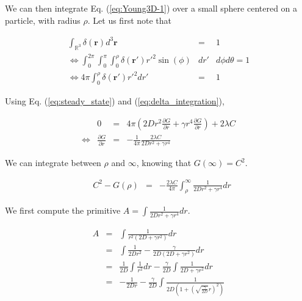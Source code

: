 \documentclass[english]{article}
\begin{document}
We can then integrate Eq. (\ref{eq:Young3D-1}) over a small sphere
centered on a particle, with radius $\rho$. Let us first note that

\begin{onehalfspace}
\noindent 
\begin{eqnarray}
\int_{\mathbb{R}^{3}}\delta(\boldsymbol{r})d^{3}\boldsymbol{r} & = & 1\nonumber \\
\Leftrightarrow\int_{0}^{2\pi}\int_{0}^{\pi}\int_{0}^{\rho}\delta(\boldsymbol{r}')r'^{2}\sin(\phi) & dr' & d\phi d\theta=1\nonumber \\
\Leftrightarrow4\pi\int_{0}^{\rho}\delta(\boldsymbol{r}')r'^{2}dr' & = & 1\label{eq:delta_integration}
\end{eqnarray}

\end{onehalfspace}

Using Eq. (\ref{eq:steady_state}) and (\ref{eq:delta_integration}), 

\begin{onehalfspace}
\noindent 
\begin{align}
 & 0 & = & 4\pi\left(2Dr^{2}\frac{\partial G}{\partial r}+\gamma r^{4}\frac{\partial G}{\partial r}\right)+2\lambda C\nonumber \\
\Leftrightarrow & \frac{\partial G}{\partial r} & = & -\frac{1}{4\pi}\frac{2\lambda C}{2Dr^{2}+\gamma r^{4}}\label{eq:deriv_G_r}
\end{align}

\end{onehalfspace}

We can integrate between $\rho$ and $\infty$, knowing that $G(\infty)=C^{2}.$

\begin{onehalfspace}
\noindent 
\begin{align}
 & C^{2}-G(\rho) & = & -\frac{2\lambda C}{4\pi}{\displaystyle \int_{\rho}^{\infty}}\frac{1}{2Dr^{2}+\gamma r^{4}}dr\label{eq:deriv_G_r_int1}
\end{align}

\end{onehalfspace}

We first compute the primitive $A=\int\frac{1}{2Dr^{2}+\gamma r^{4}}dr$. 

\begin{equation}
\begin{array}{ccc}
A & = & \int\frac{1}{r^{2}\left(2D+\gamma r^{2}\right)}dr\\
 & = & \int\frac{1}{2Dr^{2}}-\frac{\gamma}{2D\left(2D+\gamma r^{2}\right)}dr\\
 & = & \frac{1}{2D}\int\frac{1}{r^{2}}dr-\frac{\gamma}{2D}\int\frac{1}{2D+\gamma r^{2}}dr\\
 & = & -\frac{1}{2Dr}-\frac{\gamma}{2D}\int\frac{1}{2D\left(1+\left(\sqrt{\frac{\gamma}{2D}}r\right)^{2}\right)}
\end{array}
\end{equation}
\end{document}
